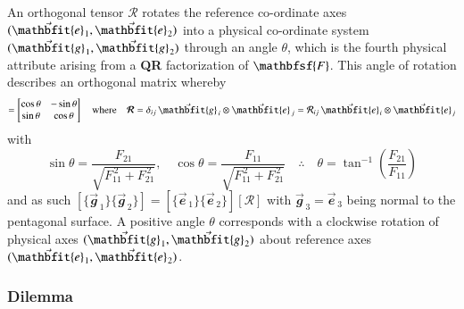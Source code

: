 An orthogonal tensor $\boldsymbol{\mathcal{R}}$ rotates the reference co-ordinate axes $( \vec{\mathbfit{e}}_{\hspace{0.5pt}1} , \vec{\mathbfit{e}}_{\hspace{0.5pt}2} )$ into a physical co-ordinate system $( \vec{\mathbfit{g}}_{\hspace{0.5pt}1} , \vec{\mathbfit{g}}_{\hspace{0.5pt}2} )$ through an angle $\theta$, which is the fourth physical attribute arising from a \textbf{QR} factorization of $\mathbfsf{F}$.  This angle of rotation describes an orthogonal matrix whereby
\begin{equation}
[ \boldsymbol{\mathcal{R}} ] = \begin{bmatrix}
\cos \theta & -\sin \theta \\
\sin \theta & \cos \theta
\end{bmatrix} 
\quad \text{where} \quad
\boldsymbol{\mathcal{R}} = \delta_{ij} \, \vec{\mathbfit{g}}_{\,i} \otimes \vec{\mathbfit{e}}_{\,j} = 
\mathcal{R}_{ij} \, \vec{\mathbfit{e}}_{\hspace{0.5pt}i} \otimes \vec{\mathbfit{e}}_{\hspace{0.5pt}j} 
\label{rotation}
\end{equation}  
with
\begin{equation}
\sin \theta = \frac{F_{21}}
{\sqrt{F_{11}^{\,2} + F_{21}^{\,2}}} , \quad
\cos \theta = \frac{F_{11}}
{\sqrt{F_{11}^{\,2} + F_{21}^{\,2}}} 
\quad \therefore \quad
\theta = \tan^{-1} \left( \frac{F_{21}}{F_{11}} \right)
\label{trigFns}
\end{equation}  
and as such $[ \{ \vec{\mathbfit{g}}_{\,1} \} \{ \vec{\mathbfit{g}}_{\,2} \} ] = [ \{ \vec{\mathbfit{e}}_{\,1} \} \{ \vec{\mathbfit{e}}_{\,2} \} ][ \boldsymbol{\mathcal{R}} ]$ with $\vec{\mathbfit{g}}_{\,3} = \vec{\mathbfit{e}}_{\,3}$ being normal to the pentagonal surface.  A positive angle $\theta$ corresponds with a clockwise rotation of physical axes $( \vec{\mathbfit{g}}_{\hspace{0.5pt}1} , \vec{\mathbfit{g}}_{\hspace{0.5pt}2} )$ about reference axes $( \vec{\mathbfit{e}}_{\hspace{0.5pt}1} , \vec{\mathbfit{e}}_{\hspace{0.5pt}2} )$.


\subsubsection{Dilemma}
\label{secDilemma} 

